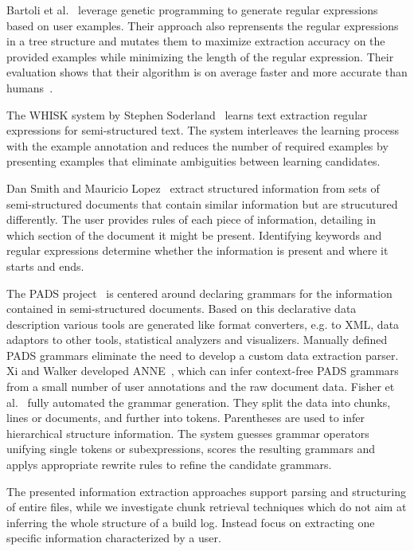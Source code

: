 \documentclass[\myrootdir/main.tex]{subfiles}
\begin{document}
Bartoli et al.~\cite{bartoli2012automatic} leverage genetic programming to generate regular expressions based on user examples.
Their approach also reprensents the regular expressions in a tree structure and mutates them to maximize extraction accuracy on the provided examples while minimizing the length of the regular expression.
Their evaluation shows that their algorithm is on average faster and more accurate than humans~\cite{bartoli2016on-the-automatic}.

The WHISK system by Stephen Soderland~\cite{soderland1999learning} learns text extraction regular expressions for semi-structured text.
The system interleaves the learning process with the example annotation and reduces the number of required examples by presenting examples that eliminate ambiguities between learning candidates.

Dan Smith and Mauricio Lopez~\cite{smith1997information} extract structured information from sets of semi-structured documents that contain similar information but are strucutured differently.
The user provides rules of each piece of information, detailing in which section of the document it might be present.
Identifying keywords and regular expressions determine whether the information is present and where it starts and ends.

The PADS project~\cite{fisher2011the-pads} is centered around declaring grammars for the information contained in semi-structured documents.
Based on this declarative data description various tools are generated like format converters, e.g. to XML, data adaptors to other tools, statistical analyzers and visualizers.
Manually defined PADS grammars eliminate the need to develop a custom data extraction parser.
Xi and Walker developed ANNE~\cite{xi2010a-context-free}, which can infer context-free PADS grammars from a small number of user annotations and the raw document data.
Fisher et al.~\cite{fisher2008from} fully automated the grammar generation.
They split the data into chunks, lines or documents, and further into tokens.
Parentheses are used to infer hierarchical structure information.
The system guesses grammar operators unifying single tokens or subexpressions, scores the resulting grammars and applys appropriate rewrite rules to refine the candidate grammars.

The presented information extraction approaches support parsing and structuring of entire files, while we investigate chunk retrieval techniques which do not aim at inferring the whole structure of a build log.
Instead focus on extracting one specific information characterized by a user.
\end{document}
